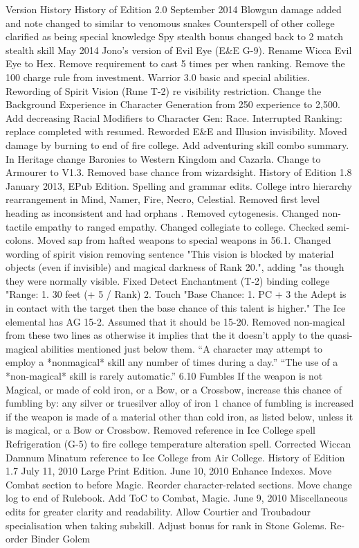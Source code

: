 \documentclass[a4paper]{article}
\begin{document}
\begin{multicols}{3}
Version History
History of Edition 2.0
September 2014
Blowgun damage added and note changed to similar to venomous snakes
Counterspell of other college clarified as being
special knowledge
Spy stealth bonus changed back to 2%
match stealth skill
May 2014
Jono's version of Evil Eye (E&E G-9).
Rename Wicca Evil Eye to Hex.
Remove requirement to cast 5 times per when
ranking.
Remove the 100 charge rule from investment.
Warrior 3.0 basic and special abilities.
Rewording of Spirit Vision (Rune T-2) re visibility
restriction.
Change the Background Experience in Character
Generation from 250 experience to 2,500.
Add decreasing Racial Modifiers to Character Gen:
Race.
Interrupted Ranking: replace completed with resumed.
Reworded E&E and Illusion invisibility.
Moved damage by burning to end of fire college.
Add adventuring skill combo summary.
In Heritage change Baronies to Western Kingdom
and Cazarla.
Change to Armourer to V1.3.
Removed base chance from wizardsight.
History of Edition 1.8
January 2013, EPub Edition. Spelling and grammar
edits. College intro hierarchy rearrangement in
Mind, Namer, Fire, Necro, Celestial. Removed first
level heading as inconsistent and had orphans .
Removed cytogenesis. Changed non-tactile empathy to ranged empathy. Changed collegiate to
college. Checked semi-colons.
Moved sap from hafted weapons to special weapons in 56.1.
Changed wording of spirit vision removing sentence "This vision is blocked by material objects
(even if invisible) and magical darkness of Rank
20.", adding "as though they were normally visible.
Fixed Detect Enchantment (T-2) binding college
"Range: 1. 30 feet (+ 5 / Rank) 2. Touch "Base
Chance: 1. PC + 3%
the Adept is in contact with the target then the base
chance of this talent is higher."
The Ice elemental has AG 15-2. Assumed that it
should be 15-20.
Removed non-magical from these two lines as
otherwise it implies that the it doesn't apply to the
quasi-magical abilities mentioned just below them.
“A character may attempt to employ a *nonmagical* skill any number of times during a day.”
“The use of a *non-magical* skill is rarely automatic.”
6.10 Fumbles If the weapon is not Magical, or
made of cold iron, or a Bow, or a Crossbow, increase this chance of fumbling by: any silver or
truesilver alloy of iron 1%
chance of fumbling is increased if the weapon is
made of a material other than cold iron, as listed
below, unless it is magical, or a Bow or Crossbow.
Removed reference in Ice College spell Refrigeration (G-5) to fire college temperature alteration
spell.
Corrected Wiccan Damnum Minatum reference to
Ice College from Air College.
History of Edition 1.7
July 11, 2010 Large Print Edition.
June 10, 2010 Enhance Indexes. Move Combat
section to before Magic. Reorder character-related
sections. Move change log to end of Rulebook.
Add ToC to Combat, Magic.
June 9, 2010 Miscellaneous edits for greater clarity
and readability. Allow Courtier and Troubadour
specialisation when taking subskill. Adjust bonus
for rank in Stone Golems. Re-order Binder Golem


\end{multicols}
\end{document}
